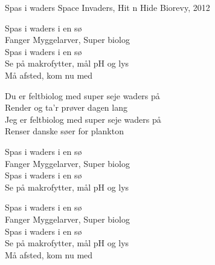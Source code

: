 \begin{song}{Spas i waders}
  {} %
  {Space Invaders, Hit n Hide} %
  {} %
  {Biorevy, 2012} %
  {\NotCCLIed} %

  \begin{SBChorus}
    Spas i waders i en sø\\
    Fanger Myggelarver, Super biolog\\
    Spas i waders i en sø\\
    Se på makrofytter, mål pH og lys\\
    Må afsted, kom nu med
  \end{SBChorus}

  \begin{SBVerse}
    Du er feltbiolog med super seje waders på\\
    Render og ta'r prøver dagen lang\\
    Jeg er feltbiolog med super seje waders på\\
    Renser danske søer for plankton
  \end{SBVerse}

  \begin{SBChorus}
    Spas i waders i en sø\\
    Fanger Myggelarver, Super biolog\\
    Spas i waders i en sø\\
    Se på makrofytter, mål pH og lys
  \end{SBChorus}

  \begin{SBChorus}
    Spas i waders i en sø\\
    Fanger Myggelarver, Super biolog\\
    Spas i waders i en sø\\
    Se på makrofytter, mål pH og lys\\
    Må afsted, kom nu med
  \end{SBChorus}




\end{song}
